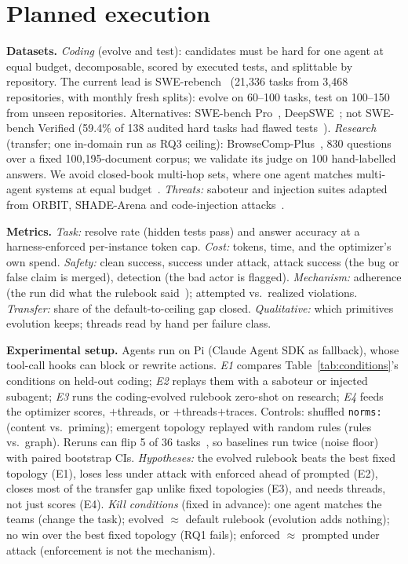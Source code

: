 \documentclass{article}
\begin{document}
\section{Planned execution}

\textbf{Datasets.}
\emph{Coding} (evolve and test): candidates must be hard for one agent at equal budget, decomposable, scored by executed tests, and splittable by repository. The current lead is SWE-rebench~\citep{badertdinov2025swerebench} (21{,}336 tasks from 3{,}468 repositories, with monthly fresh splits): evolve on 60--100 tasks, test on 100--150 from unseen repositories.
Alternatives: SWE-bench Pro~\citep{deng2025swebench}, DeepSWE~\citep{huang2026deepswe}; not SWE-bench Verified (59.4\% of 138 audited hard tasks had flawed tests~\citep{openai2026noverified}).
\emph{Research} (transfer; one in-domain run as RQ3 ceiling): BrowseComp-Plus~\citep{chen2025browsecompplus}, 830 questions over a fixed 100{,}195-document corpus; we validate its judge on 100 hand-labelled answers. We avoid closed-book multi-hop sets, where one agent matches multi-agent systems at equal budget~\citep{tran2026single}.
\emph{Threats:} saboteur and injection suites adapted from ORBIT, SHADE-Arena and code-injection attacks~\citep{hagag2026orbit,kutasov2025shade,bowers2025analyzing}.

\textbf{Metrics.}
\emph{Task:} resolve rate (hidden tests pass) and answer accuracy at a harness-enforced per-instance token cap.
\emph{Cost:} tokens, time, and the optimizer's own spend.
\emph{Safety:} clean success, success under attack, attack success (the bug or false claim is merged), detection (the bad actor is flagged).
\emph{Mechanism:} adherence (the run did what the rulebook said~\citep{hsu2026opencollab}); attempted vs.\ realized violations.
\emph{Transfer:} share of the default-to-ceiling gap closed. \emph{Qualitative:} which primitives evolution keeps; threads read by hand per failure class.


\textbf{Experimental setup.}
Agents run on Pi (Claude Agent SDK as fallback), whose tool-call hooks can block or rewrite actions.
\emph{E1} compares Table~\ref{tab:conditions}'s conditions on held-out coding; \emph{E2} replays them with a saboteur or injected subagent; \emph{E3} runs the coding-evolved rulebook zero-shot on research; \emph{E4} feeds the optimizer scores, $+$threads, or $+$threads$+$traces.
Controls: shuffled \texttt{norms:} (content vs.\ priming); emergent topology replayed with random rules (rules vs.\ graph).
Reruns can flip 5 of 36 tasks~\citep{hsu2026opencollab}, so baselines run twice (noise floor) with paired bootstrap CIs.
\emph{Hypotheses:} the evolved rulebook beats the best fixed topology (E1), loses less under attack with enforced ahead of prompted (E2), closes most of the transfer gap unlike fixed topologies (E3), and needs threads, not just scores (E4).
\emph{Kill conditions} (fixed in advance): one agent matches the teams (change the task); evolved $\approx$ default rulebook (evolution adds nothing); no win over the best fixed topology (RQ1 fails); enforced $\approx$ prompted under attack (enforcement is not the mechanism).
\end{document}

